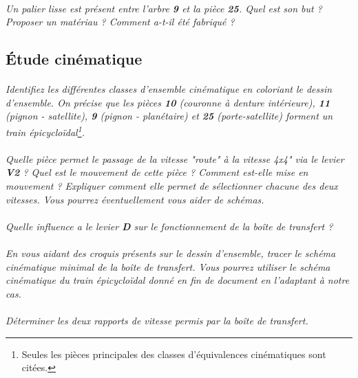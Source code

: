 \documentclass[11pt,oneside]{article}
\begin{document}
\paragraph{}
\textit{Un palier lisse est présent entre l'arbre \textbf{9} et la pièce \textbf{25}. Quel est son but ? Proposer un matériau ? Comment a-t-il été fabriqué ?}

\subsection{Étude cinématique}

\paragraph{}
\textit{Identifiez les différentes classes d'ensemble cinématique en coloriant le dessin d'ensemble. On précise que les pièces \textbf{10} (couronne à denture intérieure), \textbf{11}  (pignon - satellite), \textbf{9} (pignon - planétaire) et \textbf{25} (porte-satellite) forment un train épicycloïdal\footnote{Seules les pièces principales des classes d'équivalences cinématiques sont citées.}.}


\paragraph{}
\textit{Quelle pièce permet le passage de la vitesse "route" à la vitesse 4x4" via le levier \textbf{V2} ? Quel est le mouvement de cette pièce ? Comment est-elle mise en mouvement ? Expliquer comment elle permet de sélectionner chacune des deux vitesses. Vous pourrez éventuellement vous aider de schémas.}

\paragraph{}
\textit{Quelle influence a le levier \textbf{D} sur le fonctionnement de la boîte de transfert ?}


\paragraph{}
\textit{En vous aidant des croquis présents sur le dessin d'ensemble, tracer le schéma cinématique minimal de la boîte de transfert. Vous pourrez utiliser le schéma cinématique du train épicycloïdal donné en fin de document en l'adaptant à notre cas.}


\paragraph{}
\textit{Déterminer les deux rapports de vitesse permis par la boîte de transfert.}
\end{document}
